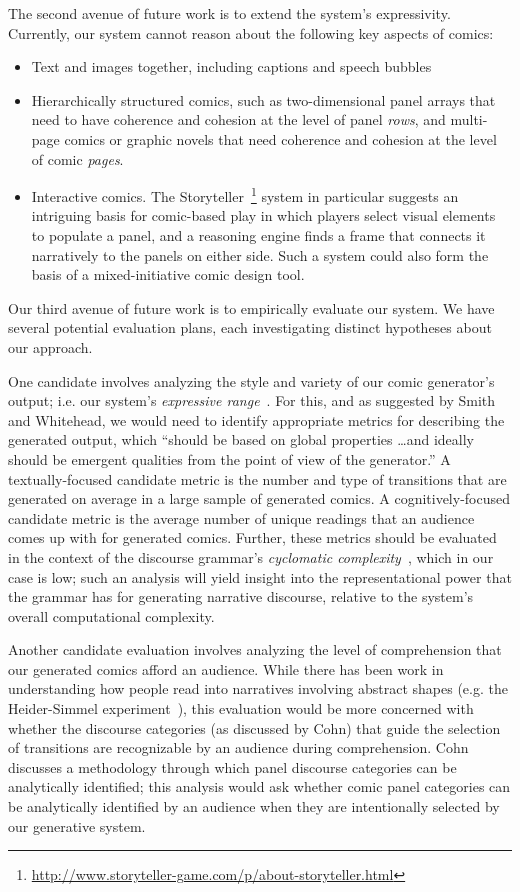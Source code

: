 The second avenue of future work is to extend the system's expressivity.
Currently, our system cannot reason about the following key aspects of
comics:
\begin{itemize}
\item Text and images together, including captions and speech bubbles
\item Hierarchically structured comics, such as two-dimensional panel
arrays that need to have coherence and cohesion at the level of panel {\em
rows}, and multi-page comics or graphic novels that need coherence and
cohesion at the level of comic {\em pages}.
\item Interactive comics. The
Storyteller~\footnote{\url{http://www.storyteller-game.com/p/about-storyteller.html}}
system in particular suggests an intriguing basis for comic-based play in
which players select visual elements to populate a panel, and a reasoning
engine finds a frame that connects it narratively to the panels on either side.
Such a system could also form the basis of a mixed-initiative comic design
tool.
\end{itemize}

Our third avenue of future work is to empirically evaluate our system.  We
have several potential evaluation plans, each investigating distinct
hypotheses about our approach.

One candidate involves analyzing the style and variety of our
comic generator's output; i.e. our system's 
\emph{expressive range}~\cite{smith2010analyzing}. For this, and as
suggested by Smith and Whitehead, we would need to identify
appropriate metrics for describing the generated output, which ``should be
based on global properties \ldots and ideally should be emergent qualities
from the point of view of the generator.'' A textually-focused candidate 
metric is the number and type of transitions that are generated on average
in a large sample of generated comics. A cognitively-focused candidate
metric is the average number of unique readings that an audience comes up
with for generated comics. Further, these metrics should be evaluated in
the context of the discourse grammar's \emph{cyclomatic
complexity}~\cite{mccabe1976complexity}, which in our case is low; such an
analysis will yield insight into the representational power that the
grammar has for generating narrative discourse, relative to the system's
overall computational complexity.

Another candidate evaluation involves analyzing the level of comprehension
that our generated comics afford an audience. While there has been work in
understanding how people read into narratives involving abstract
shapes (e.g. the Heider-Simmel experiment~\cite{heider1944experimental}),
this evaluation would be more concerned with whether the discourse
categories (as discussed by Cohn) that guide the selection of transitions
are recognizable by an audience during comprehension.
Cohn~\cite{cohn2015narrative} discusses a methodology through which panel
discourse categories can be analytically identified; this analysis would
ask whether comic panel categories can be analytically identified by an
audience when they are intentionally selected by our generative system.




